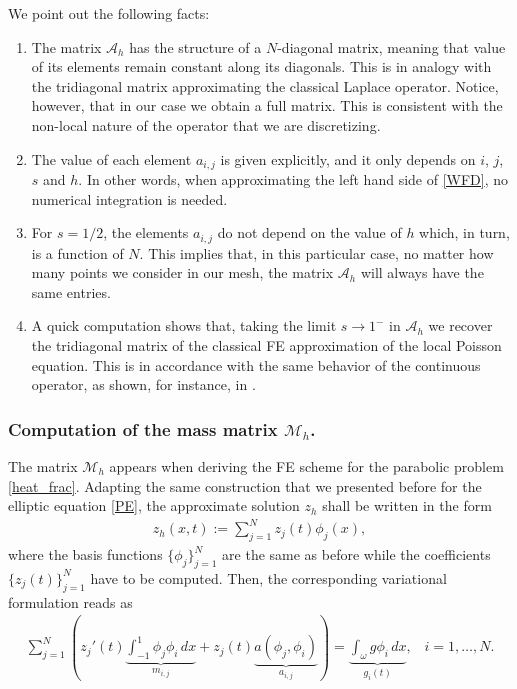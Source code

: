 \begin{remark}
We point out the following facts:
\begin{enumerate}
	\item The matrix $\mathcal A_h$ has the structure of a $N$-diagonal matrix, meaning that value of its elements remain constant along its diagonals. This is in analogy with the tridiagonal matrix approximating the classical Laplace operator. Notice, however, that in our case we obtain a full matrix. This is consistent with the non-local nature of the operator that we are discretizing.
	
	\item The value of each element $a_{i,j}$ is given explicitly, and it only depends on $i$, $j$, $s$ and $h$. In other words, when approximating the left hand side of \eqref{WFD}, no numerical integration is needed. 
	
	\item For $s=1/2$, the elements $a_{i,j}$ do not depend on the value of $h$ which, in turn, is a function of $N$. This implies that, in this particular case, no matter how many points we consider in our mesh, the matrix $\mathcal A_h$ will always have the same entries. 
	
	\item A quick computation shows that, taking the limit $s\to 1^-$ in $\mathcal A_h$ we recover the tridiagonal matrix of the classical FE approximation of the local Poisson equation. This is in accordance with the same behavior of the continuous operator, as shown, for instance, in \cite[Proposition 4.4]{dihitchhiker}.
\end{enumerate}
\end{remark}

\subsubsection*{Computation of the mass matrix $\mathcal M_h$.}

The matrix $\mathcal M_h$ appears when deriving the FE scheme for the parabolic problem \eqref{heat_frac}. Adapting the same construction that we presented before for the elliptic equation \eqref{PE}, the approximate solution $z_h$ shall be written in the form
\begin{align*}
	z_h(x,t):=\sum_{j=1}^N z_j(t)\phi_j(x),
\end{align*}
where the basis functions $\{\phi_j\}_{j=1}^N$ are the same as before while the coefficients $\{z_j(t)\}_{j=1}^N$ have to be computed. Then, the corresponding variational formulation reads as 
\begin{align*}
	\sum_{j=1}^N \left(z_j'(t)\underbrace{\int_{-1}^1 \phi_j\phi_i\,dx}_{m_{i,j}} + z_j(t)\underbrace{a(\phi_j,\phi_i)}_{a_{i,j}}\right) = \underbrace{\int_\omega g\phi_i\,dx}_{g_i(t)},\;\;\; i=1,\ldots,N.
\end{align*}

